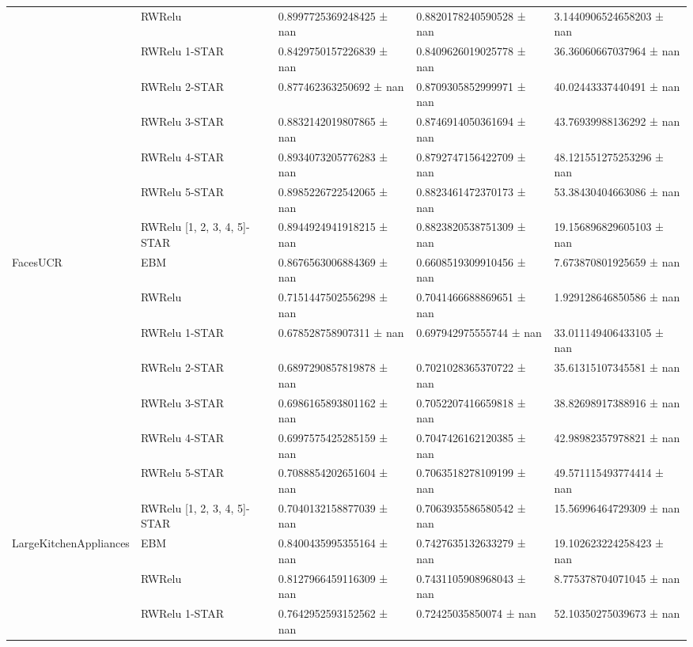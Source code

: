 \begin{tabular}{lllll}
 & RWRelu & 0.8997725369248425 ± nan & 0.8820178240590528 ± nan & 3.1440906524658203 ± nan \\
 & RWRelu 1-STAR & 0.8429750157226839 ± nan & 0.8409626019025778 ± nan & 36.36060667037964 ± nan \\
 & RWRelu 2-STAR & 0.877462363250692 ± nan & 0.8709305852999971 ± nan & 40.02443337440491 ± nan \\
 & RWRelu 3-STAR & 0.8832142019807865 ± nan & 0.8746914050361694 ± nan & 43.76939988136292 ± nan \\
 & RWRelu 4-STAR & 0.8934073205776283 ± nan & 0.8792747156422709 ± nan & 48.121551275253296 ± nan \\
 & RWRelu 5-STAR & 0.8985226722542065 ± nan & 0.8823461472370173 ± nan & 53.38430404663086 ± nan \\
 & RWRelu [1, 2, 3, 4, 5]-STAR & 0.8944924941918215 ± nan & 0.8823820538751309 ± nan & 19.156896829605103 ± nan \\
\cline{1-5}
\multirow[t]{8}{*}{FacesUCR} & EBM & 0.8676563006884369 ± nan & 0.6608519309910456 ± nan & 7.673870801925659 ± nan \\
 & RWRelu & 0.7151447502556298 ± nan & 0.7041466688869651 ± nan & 1.929128646850586 ± nan \\
 & RWRelu 1-STAR & 0.678528758907311 ± nan & 0.697942975555744 ± nan & 33.011149406433105 ± nan \\
 & RWRelu 2-STAR & 0.6897290857819878 ± nan & 0.7021028365370722 ± nan & 35.61315107345581 ± nan \\
 & RWRelu 3-STAR & 0.6986165893801162 ± nan & 0.7052207416659818 ± nan & 38.82698917388916 ± nan \\
 & RWRelu 4-STAR & 0.6997575425285159 ± nan & 0.7047426162120385 ± nan & 42.98982357978821 ± nan \\
 & RWRelu 5-STAR & 0.7088854202651604 ± nan & 0.7063518278109199 ± nan & 49.571115493774414 ± nan \\
 & RWRelu [1, 2, 3, 4, 5]-STAR & 0.7040132158877039 ± nan & 0.7063935586580542 ± nan & 15.56996464729309 ± nan \\
\cline{1-5}
\multirow[t]{8}{*}{LargeKitchenAppliances} & EBM & 0.8400435995355164 ± nan & 0.7427635132633279 ± nan & 19.102623224258423 ± nan \\
 & RWRelu & 0.8127966459116309 ± nan & 0.7431105908968043 ± nan & 8.775378704071045 ± nan \\
 & RWRelu 1-STAR & 0.7642952593152562 ± nan & 0.72425035850074 ± nan & 52.10350275039673 ± nan \\

\end{tabular}

